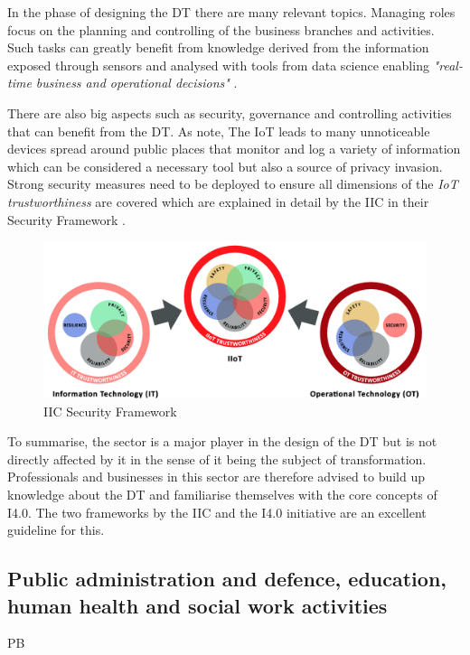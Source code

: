 In the phase of designing the \ac{DT} there are many relevant topics. Managing roles focus on the planning and controlling of the business branches and activities. Such tasks can greatly benefit from knowledge derived from the information exposed through sensors and analysed with tools from data science enabling \emph{"real-time business and operational decisions"} \cite[p.84]{iicarchitecture:2016}. 

There are also big aspects such as security, governance and controlling activities that can benefit from the \ac{DT}. As \citeauthor{Tragos2016trusted} note, The \ac{IoT} leads to many unnoticeable devices spread around public places that monitor and log a variety of information which can be considered a necessary tool but also a source of privacy invasion. Strong security measures need to be deployed to ensure all dimensions of the \emph{\ac{IoT} trustworthiness} are covered which are explained in detail by the \ac{IIC} in their Security Framework \cite{iicsecurity:2016}. 

\begin{figure}[H]
\centering
\includegraphics[width=1\columnwidth]{images/iic-iiot-trustworthiness}
\caption{\ac{IIC} Security Framework}
\end{figure}

To summarise, the sector is a major player in the design of the \ac{DT} but is not directly affected by it in the sense of it being the subject of transformation. Professionals and businesses in this sector are therefore advised to build up knowledge about the \ac{DT} and familiarise themselves with the core concepts of \ac{I4.0}. The two frameworks by the \ac{IIC} and the \ac{I4.0} initiative are an excellent guideline for this. 

\subsection{Public administration and defence, education, human health and social work activities}
PB

